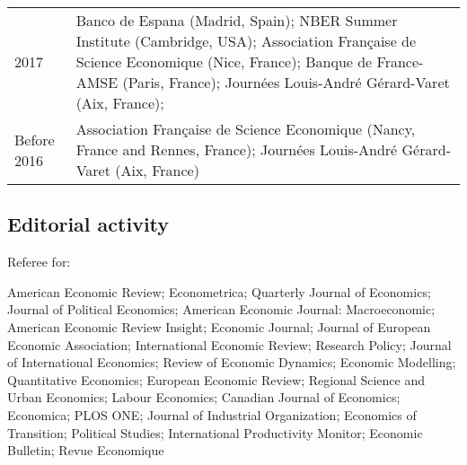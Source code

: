 \documentclass[12pt]{article}
\begin{document}
\begin{footnotesize}
\begin{tabular}{p{1cm}p{13cm}}
 2017 & Banco de Espana (Madrid, Spain); NBER Summer Institute (Cambridge, USA); Association Française de Science Economique (Nice, France); Banque de France-AMSE (Paris, France); Journées Louis-André Gérard-Varet (Aix, France);\\
 Before 2016 & Association Française de Science Economique (Nancy, France and Rennes, France); Journées Louis-André Gérard-Varet (Aix, France) 
 \end{tabular}
\end{footnotesize}

\subsection*{Editorial activity}

Referee for:  \\

\begin{footnotesize}
 American Economic Review; Econometrica; Quarterly Journal of Economics; Journal of Political Economics; American Economic Journal: Macroeconomic; American Economic Review Insight; Economic Journal; Journal of European Economic Association; International Economic Review; Research Policy; Journal of International Economics; Review of Economic Dynamics; Economic Modelling; Quantitative Economics; European Economic Review; Regional Science and Urban Economics; Labour Economics; Canadian Journal of Economics; Economica; PLOS ONE; Journal of Industrial Organization; Economics of Transition; Political Studies;  International Productivity Monitor; Economic Bulletin; Revue Economique 
\end{footnotesize}
\end{document}
